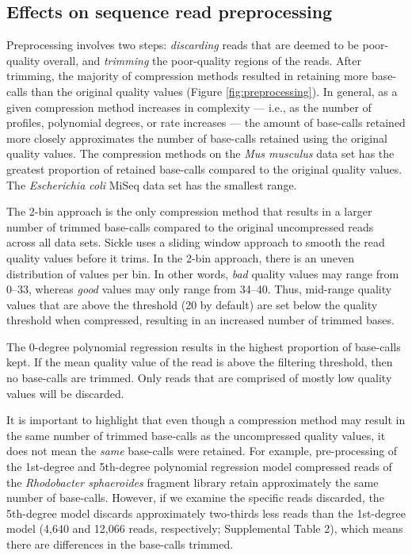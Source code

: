 \documentclass{bioinfo}
\begin{document}
\subsection{Effects on sequence read preprocessing}

Preprocessing involves two steps: \emph{discarding} reads that are
deemed to be poor-quality overall, and \emph{trimming} the
poor-quality regions of the reads. After trimming, the majority of
compression methods resulted in retaining more base-calls than the
original quality values (Figure \ref{fig:preprocessing}). In general,
as a given compression method increases in complexity --- i.e., as the
number of profiles, polynomial degrees, or rate increases --- the
amount of base-calls retained more closely approximates the number of
base-calls retained using the original quality values. The compression
methods on the \textit{Mus musculus} data set has the greatest
proportion of retained base-calls compared to the original quality
values. The \textit{Escherichia coli} MiSeq data set has the smallest
range.

The 2-bin approach is the only compression method that results in a
larger number of trimmed base-calls compared to the original
uncompressed reads across all data sets. Sickle uses a sliding window
approach to smooth the read quality values before it trims. In the
2-bin approach, there is an uneven distribution of values per bin. In
other words, \emph{bad} quality values may range from 0--33, whereas
\emph{good} values may only range from 34--40. Thus, mid-range quality
values that are above the threshold (20 by default) are set below the
quality threshold when compressed, resulting in an increased number of
trimmed bases.

The 0-degree polynomial regression results in the highest proportion
of base-calls kept. If the mean quality value of the read is above the
filtering threshold, then no base-calls are trimmed. Only reads that
are comprised of mostly low quality values will be discarded.

It is important to highlight that even though a compression method may
result in the same number of trimmed base-calls as the uncompressed
quality values, it does not mean the \emph{same} base-calls were
retained.  For example, pre-processing of the 1st-degree and
5th-degree polynomial regression model compressed reads of the
\textit{Rhodobacter sphaeroides} fragment library retain approximately
the same number of base-calls. However, if we examine the specific
reads discarded, the 5th-degree model discards approximately
two-thirds less reads than the 1st-degree model (4,640 and 12,066
reads, respectively; Supplemental Table 2), which means there are
differences in the base-calls trimmed.
\end{document}
